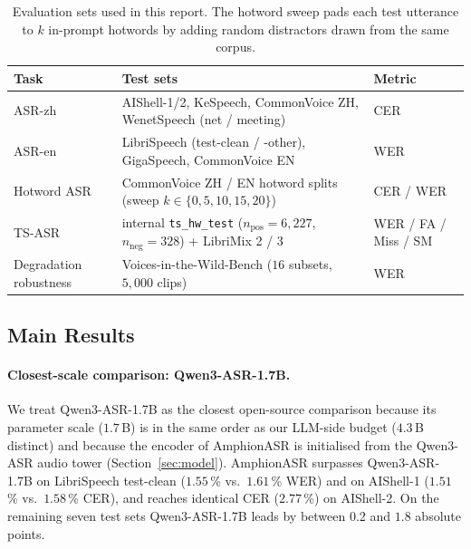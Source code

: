 \begin{table}[t]
  \caption{Evaluation sets used in this report. The hotword sweep
    pads each test utterance to $k$ in-prompt hotwords by adding
    random distractors drawn from the same corpus.}
  \label{tab:eval}
  \centering
  \small
  \begin{tabular}{lp{8.5cm}l}
    \toprule
    Task & Test sets & Metric \\
    \midrule
    ASR-zh           & AIShell-1/2, KeSpeech, CommonVoice ZH,
                       WenetSpeech (net / meeting)                                & CER \\
    ASR-en           & LibriSpeech (test-clean / -other), GigaSpeech,
                       CommonVoice EN                                             & WER \\
    Hotword ASR      & CommonVoice ZH / EN hotword splits (sweep
                       $k\!\in\!\{0, 5, 10, 15, 20\}$)                            & CER / WER \\
    TS-ASR           & internal \texttt{ts\_hw\_test} ($n_\text{pos}\!=\!6{,}227$,
                       $n_\text{neg}\!=\!328$) + LibriMix 2 / 3 \cite{cosentino2020librimix}
                                                                                & WER / FA / Miss / SM \\
    Degradation robustness & Voices-in-the-Wild-Bench \cite{xie2026mega}
                       ($16$ subsets, $5{,}000$ clips)                            & WER \\
    \bottomrule
  \end{tabular}
\end{table}

\subsection{Main Results}





\paragraph{Closest-scale comparison: Qwen3-ASR-1.7B.}
We treat Qwen3-ASR-1.7B as the closest open-source comparison
because its parameter scale ($1.7$\,B) is in the same order as our
LLM-side budget ($4.3$\,B distinct) and because the encoder of
AmphionASR is initialised from the Qwen3-ASR audio tower
(Section~\ref{sec:model}). AmphionASR surpasses Qwen3-ASR-1.7B on
LibriSpeech test-clean ($1.55$\,\% vs.\ $1.61$\,\% WER) and on
AIShell-1 ($1.51$\,\% vs.\ $1.58$\,\% CER), and reaches identical
CER ($2.77$\,\%) on AIShell-2. On the remaining seven test sets
Qwen3-ASR-1.7B leads by between $0.2$ and $1.8$ absolute points.

